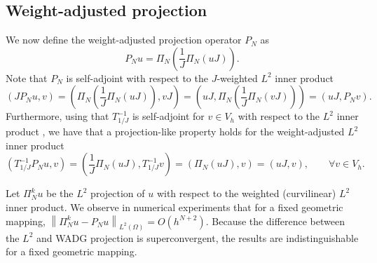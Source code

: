 \documentclass[preprint,10pt]{article}
\theoremstyle{definition}
\theoremstyle{lemma}
\theoremstyle{theorem}
\theoremstyle{assumption}
\newcommand{\nor}[1]{\left\| #1 \right\|}
\newcommand{\LRp}[1]{\left( #1 \right)}
\begin{document}
\subsection{Weight-adjusted projection} 
We now define the weight-adjusted projection operator $P_N$ as 
\[
P_N u = \Pi_N\LRp{\frac{1}{J}\Pi_N\LRp{uJ}}.
\]
Note that $P_N$ is self-adjoint with respect to the $J$-weighted $L^2$ inner product
\begin{equation}
\LRp{J P_N u, v} = \LRp{\Pi_N\LRp{\frac{1}{J}\Pi_N\LRp{uJ}}, vJ} = \LRp{uJ, \Pi_N\LRp{\frac{1}{J}\Pi_N\LRp{vJ}}} =  \LRp{uJ, P_N v}.
\label{eq:PNsym}
\end{equation}
Furthermore, using that $T_{1/J}^{-1}$ is self-adjoint for $v \in V_h$ with respect to the $L^2$ inner product \cite{chan2016weight1}, we have that a projection-like property holds for the weight-adjusted $L^2$ inner product
\begin{equation}
\LRp{T_{1/J}^{-1} P_N u,v} = \LRp{ \frac{1}{J}\Pi_N(uJ),T_{1/J}^{-1}v} = \LRp{\Pi_N(u J),v} = \LRp{u J,v}, \qquad \forall v\in V_h.
\label{eq:PNproj}
\end{equation}


Let $\Pi_N^k u$ be the $L^2$ projection of $u$ with respect to the weighted (curvilinear) $L^2$ inner product.  We observe in numerical experiments that for a fixed geometric mapping, $\nor{\Pi_N^k u - P_N u}_{L^2\LRp{\Omega}} = O(h^{N+2})$.  Because the difference between the $L^2$ and WADG projection is superconvergent, the results are indistinguishable for a fixed geometric mapping.  
\end{document}
